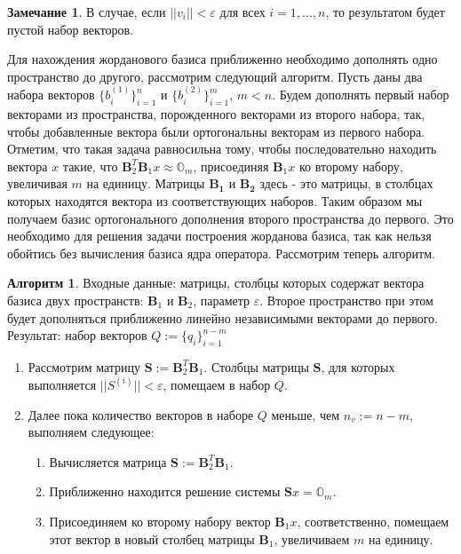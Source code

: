 \documentclass[specialist, substylefile = spbureport.rtx, subf,href,colorlinks=true, 12pt]{disser}
\theoremstyle{definition}
\newtheorem{algorithm}{Алгоритм}
\newtheorem{remark}{Замечание}
\begin{document}
\begin{remark}
    В случае, если $||v_i|| < \varepsilon$ для всех $i = 1, \dots, n$, то результатом будет пустой набор векторов.
\end{remark}
Для нахождения жорданового базиса приближенно необходимо дополнять одно пространство до другого, рассмотрим следующий алгоритм. Пусть даны два набора векторов $\{b^{(1)}_i\}_{i = 1}^n$ и $\{b^{(2)}_i\}_{i = 1}^m$, $m < n$. Будем дополнять первый набор векторами из пространства, порожденного векторами из второго набора, так, чтобы добавленные вектора были ортогональны векторам из первого набора. Отметим, что такая задача равносильна тому, чтобы последовательно находить вектора $x$ такие, что $\mathbf{B}_2^T\mathbf{B}_1x \approx \mathds{O}_{m}$, присоединяя $\mathbf{B}_1x$ ко второму набору, увеличивая $m$ на единицу. Матрицы $\mathbf{B_1}$ и $\mathbf{B_2}$ здесь - это матрицы, в столбцах которых находятся вектора из соответствующих наборов. Таким образом мы получаем базис ортогонального дополнения второго пространства до первого. Это необходимо для решения задачи построения жорданова базиса, так как нельзя обойтись без вычисления базиса ядра оператора. Рассмотрим теперь алгоритм.

\begin{algorithm}\label{alg6}
Входные данные: матрицы, столбцы которых содержат вектора базиса двух пространств: $\mathbf{B}_1$ и $\mathbf{B}_2$, параметр $\varepsilon$. Второе пространство при этом будет дополняться приближенно линейно независимыми векторами до первого.
\\
Результат: набор векторов $Q := \{ q_i \}_{i = 1}^{n - m}$
\begin{enumerate}
    \item Рассмотрим матрицу $\mathbf{S} := \mathbf{B}_{2}^T\mathbf{B}_{1}$. Столбцы матрицы $\mathbf{S}$, для которых выполняется $||S^{(i)}|| < \varepsilon$, помещаем в набор $Q$. \label{alg6p1}
    \item Далее пока количество векторов в наборе $Q$ меньше, чем $n_v := n - m$, выполняем следующее:
    \begin{enumerate}
        \item Вычисляется матрица $\mathbf{S} := \mathbf{B}_{2}^T\mathbf{B}_{1}$.
        \item Приближенно находится решение системы $\mathbf{S}x = \mathds{O}_m$. \label{alg6p2b}
        \item Присоединяем ко второму набору вектор $\mathbf{B}_1x$, соответственно, помещаем этот вектор в новый столбец матрицы $\mathbf{B}_1$, увеличиваем $m$ на единицу.
    \end{enumerate}
\end{enumerate}
\end{algorithm}
\end{document}
